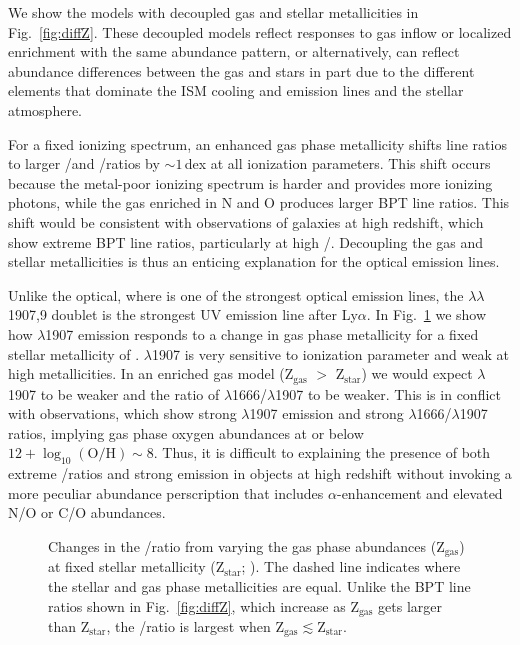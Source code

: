 We show the models with decoupled gas and stellar metallicities in Fig.~\ref{fig:diffZ}. These decoupled models reflect responses to gas inflow or localized enrichment with the same abundance pattern, or alternatively, can reflect abundance differences between the gas and stars in part due to the different elements that dominate the ISM cooling and emission lines and the stellar atmosphere.

For a fixed ionizing spectrum, an enhanced gas phase metallicity shifts line ratios to larger \nii/\ha and \oiii/\hb ratios by ${\sim}1\,$dex at all ionization parameters. This shift occurs because the metal-poor ionizing spectrum is harder and provides more ionizing photons, while the gas enriched in N and O produces larger BPT line ratios. This shift would be consistent with observations of galaxies at high redshift, which show extreme BPT line ratios, particularly at high \oiii/\ha.  Decoupling the gas and stellar metallicities is thus an enticing explanation for the optical emission lines.

Unlike the optical, where \oiii is one of the strongest optical emission lines, the \ciii$\lambda\lambda$1907,9 doublet is the strongest UV emission line after Ly$\alpha$. In Fig.~\ref{fig:diffZCO} we show how \ciii$\lambda$1907 emission responds to a change in gas phase metallicity for a fixed stellar metallicity of . \ciii$\lambda$1907 is very sensitive to ionization parameter and weak at high metallicities. In an enriched gas model (Z$_{\mathrm{gas}}$ $>$ Z$_{\mathrm{star}}$) we would expect \ciii$\lambda$1907 to be weaker and the ratio of \oiii$\lambda$1666/\ciii$\lambda$1907 to be weaker. This is in conflict with observations, which show strong \ciii$\lambda$1907 emission and strong \oiii$\lambda$1666/\ciii$\lambda$1907 ratios, implying gas phase oxygen abundances at or below $12+\log_{10}(\mathrm{O}/\mathrm{H})\sim 8$. Thus, it is difficult to explaining the presence of both extreme \oiii/\ha ratios and strong \ciii emission in objects at high redshift without invoking a more peculiar abundance perscription that includes $\alpha$-enhancement and elevated N/O or C/O abundances. 

\begin{figure}
  \begin{center}
    \caption{Changes in the \oiii/\ciii ratio from varying the gas phase abundances (Z$_{\mathrm{gas}}$) at fixed stellar metallicity (Z$_{\mathrm{star}}$; ). The dashed line indicates where the stellar and gas phase metallicities are equal. Unlike the BPT line ratios shown in Fig.~\ref{fig:diffZ}, which increase as $\mathrm{Z}_{\mathrm{gas}}$ gets larger than $\mathrm{Z}_{\mathrm{star}}$, the \oiii/\ciii ratio is largest when $\mathrm{Z}_{\mathrm{gas}}\lesssim \mathrm{Z}_{\mathrm{star}}$.}
    \label{fig:diffZCO}
  \end{center}
\end{figure}

